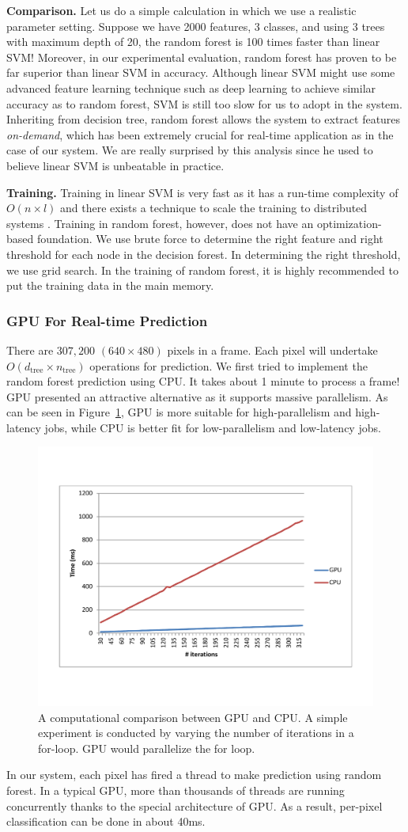 \textbf{Comparison.} Let us do a simple calculation in which we use a realistic parameter setting. Suppose we have 2000 features, 3 classes, and using 3 trees with maximum depth of 20, the random forest is 100 times faster than linear SVM! Moreover, in our experimental evaluation, random forest has proven to be far superior than linear SVM in accuracy. Although linear SVM might use some advanced feature learning technique such as deep learning to achieve similar accuracy as to random forest, SVM is still too slow for us to adopt in the system. Inheriting from decision tree, random forest allows the system to extract features \textit{on-demand}, which has been extremely crucial for real-time application as in the case of our system. We are really surprised by this analysis since he used to believe linear SVM is unbeatable in practice.

\textbf{Training.} Training in linear SVM is very fast as it has a run-time complexity of $O(n\times l)$ and there exists a technique to scale the training to distributed systems \cite{michael}. Training in random forest, however, does not have an optimization-based foundation. We use brute force to determine the right feature and right threshold for each node in the decision forest. In determining the right threshold, we use grid search. In the training of random forest, it is highly recommended to put the training data in the main memory.


\cutsection
\subsubsection{GPU For Real-time Prediction}
\cutsection
There are $307,200$ $(640\times 480)$ pixels in a frame. Each pixel will undertake $O(d_{\text{tree}}\times n_{\text{tree}})$ operations for prediction. We first tried to implement the random forest prediction using CPU. It takes about 1 minute to process a frame! GPU presented an attractive alternative as it supports massive parallelism. As can be seen in Figure~\ref{fig: GPUvsCPU}, GPU is more suitable for high-parallelism and high-latency jobs, while CPU is better fit for low-parallelism and low-latency jobs.

\begin{figure}
	\includegraphics[width=0.45 \textwidth]{fig/GPUvsCPU.pdf}
		\cutcaption
    \caption{A computational comparison between GPU and CPU. A simple experiment is conducted by varying the number of iterations in a for-loop. GPU would parallelize the for loop.}
    \label{fig: GPUvsCPU}
\end{figure}

In our system, each pixel has fired a thread to make prediction using random forest. In a typical GPU, more than thousands of threads are running concurrently thanks to the special architecture of GPU. As a result, per-pixel classification can be done in about 40ms.
